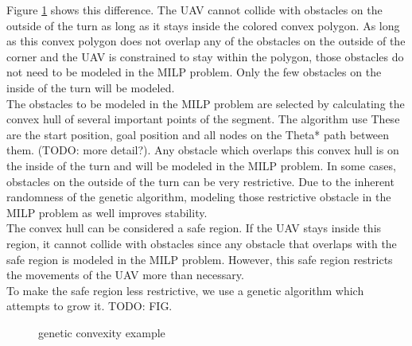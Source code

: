 Figure \ref{fig:genetic-convex} shows this difference. The UAV cannot collide with obstacles on the outside of the turn as long as it stays inside the colored convex polygon. As long as this convex polygon does not overlap any of the obstacles on the outside of the corner and the UAV is constrained to stay within the polygon, those obstacles do not need to be modeled in the MILP problem. Only the few obstacles on the inside of the turn will be modeled.\\


The obstacles to be modeled in the MILP problem are selected by calculating the convex hull of several important points of the segment. The algorithm use These are the start position, goal position and all nodes on the Theta* path between them. (TODO: more detail?). Any obstacle which overlaps this convex hull is on the inside of the turn and will be modeled in the MILP problem. In some cases, obstacles on the outside of the turn can be very restrictive. Due to the inherent randomness of the genetic algorithm, modeling those restrictive obstacle in the MILP problem as well improves stability. \\
The convex hull can be considered a safe region. If the UAV stays inside this region, it cannot collide with obstacles since any obstacle that overlaps with the safe region is modeled in the MILP problem. However, this safe region restricts the movements of the UAV more than necessary. \\
To make the safe region less restrictive, we use a genetic algorithm which attempts to grow it. TODO: FIG.
\begin{figure}
\centering
\caption{genetic convexity example}
\label{fig:genetic-convex}
\end{figure}
